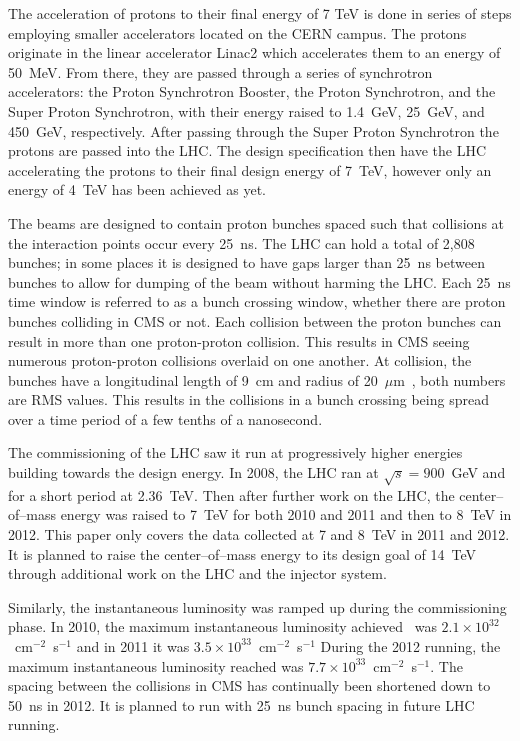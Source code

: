 The acceleration of protons to their final energy of 7 TeV is done in series of steps employing smaller accelerators located on the CERN campus. 
The protons originate in the linear accelerator Linac2 which accelerates them to an energy of 50~MeV.
From there, they are passed through a series of synchrotron accelerators: the Proton Synchrotron Booster, the Proton Synchrotron,
and the Super Proton Synchrotron, with their energy raised to 1.4~GeV, 25~GeV, and 450~GeV, respectively. After passing through the Super Proton Synchrotron the protons
are passed into the LHC. The design specification then have the LHC accelerating the protons to their final design energy of 7~TeV, however only an energy of 4~TeV
has been achieved as yet.

The beams are designed to contain proton bunches spaced such that collisions at the interaction points occur every 25~ns. 
The LHC can hold a total of 2,808 bunches; in some places it is designed to have gaps larger than 25~ns between
bunches to allow for dumping of the beam without harming the LHC.
Each 25~ns time window is referred to as a bunch crossing window, whether there are proton bunches colliding in CMS or not.
Each collision between the proton bunches can
result in more than one proton-proton collision. This results in CMS seeing numerous proton-proton collisions overlaid on one another.
At collision, the bunches have a longitudinal length of 9~cm and radius of 20~$\mu$m~\cite{PDG}, both numbers are RMS values.
This results in the collisions in a bunch crossing being spread over a time period of a few tenths of a nanosecond.

The commissioning of the LHC saw it run at progressively higher energies building towards the design energy. In 2008, the LHC ran at
$\sqrt{s}=900$~GeV and for a short period at 2.36~TeV. Then after further work on the LHC, the center--of--mass energy was raised 
to 7~TeV for both 2010 and 2011 and then to 8~TeV in 2012.
This paper only covers the data collected at 7 and 8~TeV in 2011 and 2012. It is planned to raise the center--of--mass energy to its 
design goal of 14~TeV through additional work on the LHC and the injector system.

Similarly, the instantaneous luminosity was ramped up during the commissioning phase. In 2010, the maximum instantaneous luminosity achieved~\cite{PublicLumi}
was $2.1\times10^{32}$~cm$^{-2}$~s$^{-1}$ and in 2011 it was $3.5\times10^{33}$~cm$^{-2}$~s$^{-1}$
During the 2012 running, the maximum instantaneous luminosity reached was $7.7\times10^{33}$~cm$^{-2}$~s$^{-1}$.
The spacing between the collisions in CMS has continually been shortened down to 50~ns in 2012.
It is planned to run with 25~ns bunch spacing in future LHC running.

